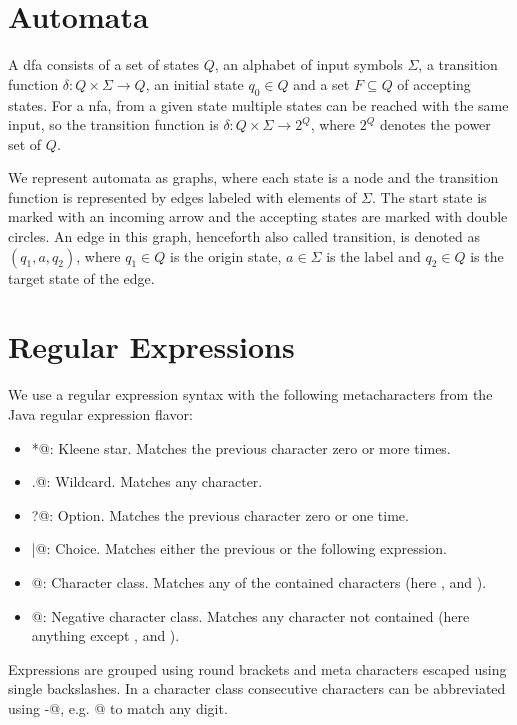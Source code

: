 \section{Automata}\label{sec:background:automata}

A \acf{dfa} consists of a set of states $Q$, an alphabet of input symbols $\Sigma$, a transition function $\delta: Q \times \Sigma \rightarrow Q$, an initial state $q_0 \in Q$ and a set $F \subseteq Q$ of accepting states.
For a \acf{nfa}, from a given state multiple states can be reached with the same input, so the transition function is  $\delta: Q \times \Sigma \rightarrow 2^Q$, where $2^Q$ denotes the power set of $Q$.

We represent automata as graphs, where each state is a node and the transition function is represented by edges labeled with elements of $\Sigma$. The start state is marked with an incoming arrow and the accepting states are marked with double circles.
An edge in this graph, henceforth also called transition, is denoted as $(q_1, a, q_2)$, where $q_1 \in Q$ is the origin state, $a \in \Sigma$ is the label and $q_2 \in Q$ is the target state of the edge.

\section{Regular Expressions}\label{sec:background:regex}

We use a regular expression syntax with the following metacharacters from the Java regular expression flavor:

\begin{itemize}
	\item \Verb@*@: Kleene star. Matches the previous character zero or more times.
	\item \Verb@.@: Wildcard. Matches any character.
	\item \Verb@?@: Option. Matches the previous character zero or one time.
	\item \Verb@|@: Choice. Matches either the previous or the following expression.
	\item \Verb@[abc]@: Character class. Matches any of the contained characters (here \Verb@a@, \Verb@b@ and \Verb@c@).
	\item \Verb@[^abc]@: Negative character class. Matches any character not contained (here anything except \Verb@a@, \Verb@b@ and \Verb@c@).
\end{itemize}

Expressions are grouped using round brackets and meta characters escaped using single backslashes.
In a character class consecutive characters can be abbreviated using \Verb@-@, e.g. \Verb@[0-9]@ to match any digit.

